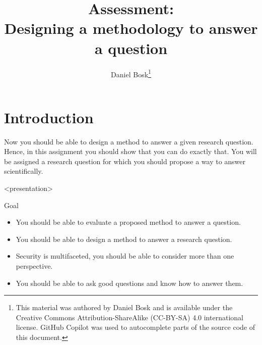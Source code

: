 \title{%
  Assessment:\\
  Designing a methodology to answer a question
}
\author{Daniel Bosk\thanks{%
   This material was authored by Daniel Bosk and is available under the 
   Creative Commons Attribution-ShareAlike (CC-BY-SA) 4.0 international 
   license.
   GitHub Copilot was used to autocomplete parts of the source code of this 
   document.
}}

\mode*

\begin{frame}
  \maketitle
\end{frame}

\begin{abstract}
  
\end{abstract}

\clearpage


\section{Introduction}

Now you should be able to design a method to answer a given research question.
Hence, in this assignment you should show that you can do exactly that.
You will be assigned a research question for which you should propose a way to 
answer scientifically.

\begin{frame}<presentation>
  \begin{block}{Goal}
    \begin{itemize}
      \item You should be able to evaluate a proposed method to answer a 
        question.
      \item You should be able to design a method to answer a research 
        question.
      \item Security is multifaceted, you should be able to consider more than 
        one perspective.
      \item You should be able to ask good questions and know how to answer 
        them.
    \end{itemize}
  \end{block}
\end{frame}

%
%
%

